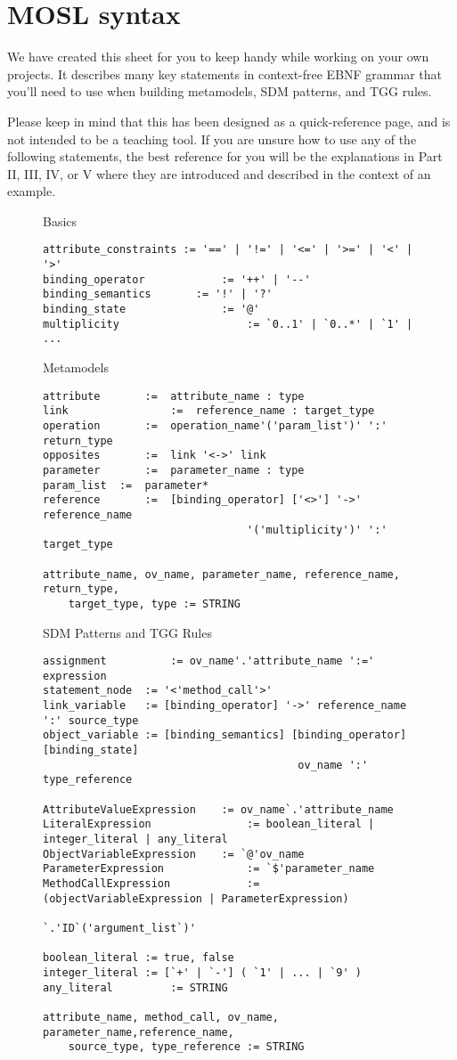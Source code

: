 \newpage
\section{MOSL syntax}
\texHeader

We have created this sheet for you to keep handy while working on your own projects. It describes many key statements in context-free EBNF grammar that you'll
need to use when building metamodels, SDM patterns, and TGG rules.

Please keep in mind that this has been designed as a quick-reference page, and is not intended to be a teaching tool. If you are unsure how to use any
of the following statements, the best reference for you will be the explanations in Part II, III, IV, or V where they are introduced and described in the
context of an example.

\begin{figure}[htbp]
Basics
\begin{lstlisting}[backgroundcolor=\color{codelightgray}]
attribute_constraints := '==' | '!=' | '<=' | '>=' | '<' | '>'
binding_operator 			:= '++' | '--'
binding_semantics 		:= '!' | '?'
binding_state 				:= '@'
multiplicity 					:= `0..1' | `0..*' | `1' | ...
\end{lstlisting}

Metamodels
\begin{lstlisting}[backgroundcolor=\color{codelightgray}]
attribute		:=	attribute_name : type
link				:=	reference_name : target_type
operation		:=	operation_name'('param_list')' ':' return_type
opposites		:=	link '<->' link
parameter		:=	parameter_name : type
param_list	:=	parameter*
reference		:=	[binding_operator] ['<>'] '->' reference_name 
								'('multiplicity')' ':' target_type

attribute_name, ov_name, parameter_name, reference_name, return_type, 
	target_type, type := STRING
\end{lstlisting}

SDM Patterns and TGG Rules
\begin{lstlisting}[backgroundcolor=\color{codelightgray}]
assignment			:= ov_name'.'attribute_name ':=' expression
statement_node	:= '<'method_call'>'
link_variable 	:= [binding_operator] '->' reference_name ':' source_type
object_variable := [binding_semantics] [binding_operator] [binding_state] 
										ov_name ':' type_reference
										
AttributeValueExpression 	:= ov_name`.'attribute_name
LiteralExpression 				:= boolean_literal | integer_literal | any_literal
ObjectVariableExpression 	:= `@'ov_name
ParameterExpression 			:= `$'parameter_name
MethodCallExpression 			:= (objectVariableExpression | ParameterExpression)
															`.'ID`('argument_list`)'

boolean_literal := true, false
integer_literal := [`+' | `-'] ( `1' | ... | `9' )
any_literal 		:= STRING

attribute_name, method_call, ov_name, parameter_name,reference_name, 
	source_type, type_reference := STRING
\end{lstlisting}
\end{figure}
